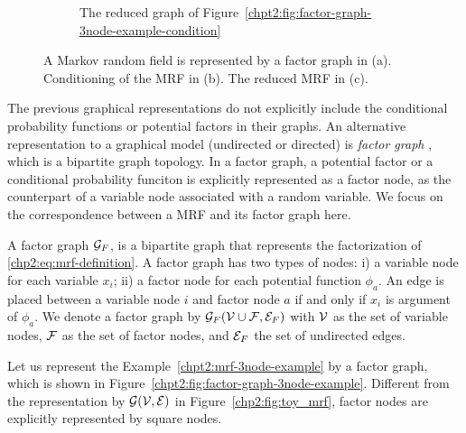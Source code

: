 \begin{figure}[!t]
\begin{subfigure}{.3\textwidth}
    \caption{The reduced graph of Figure~\ref{chpt2:fig:factor-graph-3node-example-condition}}
    \label{chpt2:fig:factor-graph-3node-example-reduced}
  \end{subfigure}
  
  \caption{A Markov random field is represented by a factor graph in (a). Conditioning of the MRF in (b). The reduced MRF in (c).}
  \label{chp2:tab:toy-factor-graph}
\end{figure}

The previous graphical representations do not explicitly include the conditional probability functions or potential factors in their graphs. An alternative representation to a graphical model (undirected or directed) is \textit{factor graph} \cite{kschischang2001factor_graph},
which is a bipartite graph topology. In a factor graph, a potential factor or a conditional probability funciton is explicitly represented as a factor node, as the counterpart of a variable node associated with a random variable. We focus on the correspondence between a MRF and its factor graph here.
\begin{definition}\label{chpt2:def:factor-graph}
  A factor graph $\mathcal{G}_F$, is a bipartite graph that represents the factorization of \eqref{chp2:eq:mrf-definition}. A factor graph has two types of nodes: i) a variable node for each variable $x_i$; ii) a factor node for each potential function $\phi_{a}$. An edge is placed between a variable node $i$ and factor node $a$ if and only if $x_i$ is argument of $\phi_{a}$. We denote a factor graph by $\mathcal{G}_F(\mathcal{V} \cup \mathcal{F}, \mathcal{E}_F)$ with $\mathcal{V}$ as the set of variable nodes, $\mathcal{F}$ as the set of factor nodes, and $\mathcal{E}_F$ the set of undirected edges.
\end{definition}
\begin{example}
  Let us represent the Example~\ref{chpt2:mrf-3node-example} by a factor graph, which is shown in Figure~\ref{chpt2:fig:factor-graph-3node-example}. Different from the representation by $\mathcal{G}(\mathcal{V}, \mathcal{E})$ in Figure~\ref{chp2:fig:toy_mrf}, factor nodes are explicitly represented by square nodes.
\end{example}


